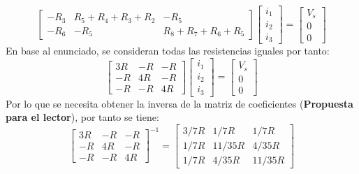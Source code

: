 \documentclass[
  11pt,
  letterpaper,
   addpoints,
   answers
  ]{exam}
\begin{document}
\begin{solution}
\begin{enumerate}
\begin{equation}
\begin{bmatrix}
            -R_3 & R_5 + R_4 + R_3 + R_2 & -R_5 \\
            -R_6 & -R_5 & R_8 + R_7 + R_6 + R_5
        \end{bmatrix}
        \begin{bmatrix}
            i_1 \\
            i_2 \\
            i_3
        \end{bmatrix}
        =
        \begin{bmatrix}
            V_s \\
            0 \\
            0
        \end{bmatrix}
    \end{equation}
    En base al enunciado, se consideran todas las resistencias iguales por tanto:
    \begin{equation}
        \begin{bmatrix}
            3R & -R & -R \\
            -R & 4R & -R \\
            -R & -R & 4R
        \end{bmatrix}
        \begin{bmatrix}
            i_1 \\
            i_2 \\
            i_3
        \end{bmatrix}
        =
        \begin{bmatrix}
            V_s \\
            0 \\
            0
        \end{bmatrix}
    \end{equation}
    Por lo que se necesita obtener la inversa de la matriz de coeficientes (\textbf{Propuesta para el lector}), por tanto se tiene:
    \begin{equation}
        \begin{bmatrix}
            3R & -R & -R \\
            -R & 4R & -R \\
            -R & -R & 4R
        \end{bmatrix}^{-1}
        =
        \begin{bmatrix}
            3/7R & 1/7R & 1/7R \\
            1/7R & 11/35R & 4/35R \\
            1/7R & 4/35R & 11/35R
        \end{bmatrix}

\end{equation}
\end{enumerate}
\end{solution}
\end{document}
